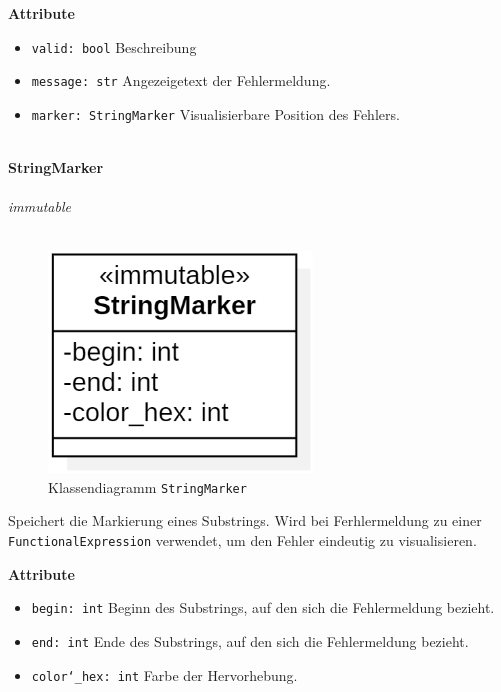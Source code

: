 \documentclass{article}
\begin{document}
\textbf{Attribute}
\begin{itemize}
\item \texttt{valid: bool} \newline Beschreibung
\item \texttt{message: str} \newline Angezeigetext der Fehlermeldung.
\item \texttt{marker: StringMarker} \newline Visualisierbare Position des Fehlers.
\\\\
\end{itemize}


\newpage
\textbf{\large{StringMarker}}\\\\
\textit{\flqq{}immutable\frqq}\normalsize\\\\
\begin{figure}[H]%
    \centering
    \includegraphics[width=7cm]{entwurf/Entwurf_dokument/img/cls/model/StringMarker.png}
    \caption{Klassendiagramm \texttt{StringMarker}}
\end{figure}

Speichert die Markierung eines Substrings. Wird bei Ferhlermeldung zu einer \texttt{FunctionalExpression} verwendet, um den Fehler eindeutig zu visualisieren.
\newline \newline

\textbf{Attribute}
\begin{itemize}
\item \texttt{begin: int} \newline Beginn des Substrings, auf den sich die Fehlermeldung bezieht.
\item \texttt{end: int} \newline Ende des Substrings, auf den sich die Fehlermeldung bezieht.
\item \texttt{color\char`_hex: int} \newline Farbe der Hervorhebung.
\\\\
\end{itemize}
\end{document}
